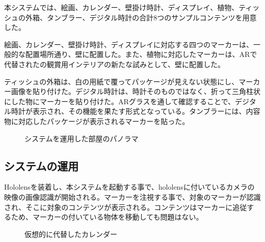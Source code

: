 本システムでは、絵画、カレンダー、壁掛け時計、ディスプレイ、植物、ティッシュの外箱、タンブラー、デジタル時計の合計8つのサンプルコンテンツを用意した。

絵画、カレンダー、壁掛け時計、ディスプレイに対応する四つのマーカーは、一般的な配置場所通り、壁に配置した。また、植物に対応したマーカーは、ARで代替されたの観賞用インテリアの新たな試みとして、壁に配置した。

ティッシュの外箱は、白の用紙で覆ってパッケージが見えない状態にし、マーカー画像を貼り付けた。デジタル時計は、時計そのものではなく、折って三角柱状にした物にマーカーを貼り付けた。ARグラスを通して確認することで、デジタル時計が表示され、その機能を果たす形式となっている。タンブラーには、内容物に対応したパッケージが表示されるマーカーを貼った。

\begin{figure}[htbp]
  \begin{center}
  \end{center}
  \caption{システムを運用した部屋のパノラマ}
  \label{fig:room-panorama}
\end{figure}

\subsection{システムの運用}

Hololensを装着し、本システムを起動する事で、hololensに付いているカメラの映像の画像認識が開始される。マーカーを注視する事で、対象のマーカーが認識され、そこに対象のコンテンツが表示される。コンテンツはマーカーに追従するため、マーカーの付いている物体を移動しても問題はない。

\begin{figure}[htbp]
  \begin{center}
  \end{center}
  \caption{仮想的に代替したカレンダー}
\end{figure}

